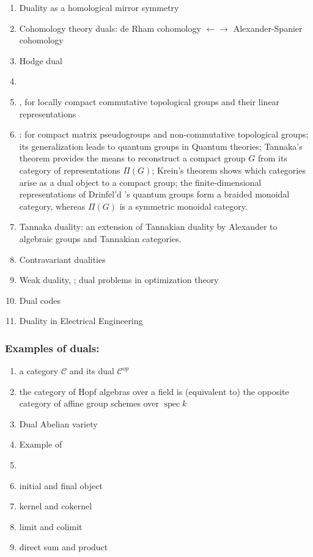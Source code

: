 \documentclass[12pt]{article}
\theoremstyle{plain}
\theoremstyle{definition}
\numberwithin{equation}{section}
\begin{document}
\begin{enumerate}
\item Duality as a homological mirror symmetry
\item Cohomology theory duals: de Rham cohomology $\leftarrow \rightarrow$ Alexander-Spanier cohomology
\item Hodge dual 
\item {}
\item {}, for locally compact commutative topological groups and their linear representations
\item {}: for compact matrix pseudogroups and non-commutative topological groups; its generalization leads to quantum groups in Quantum theories; Tannaka's theorem provides the means to reconstruct a compact group $G$ from its category of representations $\Pi(G)$; Krein's theorem shows which categories arise as a dual object to a compact group; the finite-dimensional representations of Drinfel'd 's quantum
groups form a braided monoidal category, whereas $\Pi(G)$ is a symmetric monoidal category.
\item Tannaka duality: an extension of Tannakian duality by 
Alexander  to algebraic groups and
Tannakian categories.
\item Contravariant dualities 
\item Weak duality, ;
dual problems in optimization theory 
\item Dual codes
\item Duality in Electrical Engineering 
\end{enumerate}

\subsubsection{Examples of duals:}

\begin{enumerate}
\item a category $\mathcal{C}$ and its dual $\mathcal{C}^{op}$
\item the category of Hopf algebras over a field  is (equivalent to) the opposite category of affine group schemes over
 $\operatorname{spec} k$
\item Dual Abelian variety
\item Example of 
\item {}
\item initial and final object
\item kernel and cokernel
\item limit and colimit
\item direct sum and product
\end{enumerate}
\end{document}
